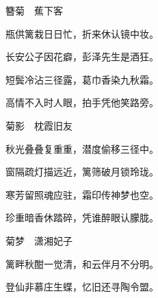 \begin{poem}
    \begin{pl}

        簪菊　蕉下客
    \end{pl}
    \begin{pl}

        瓶供篱栽日日忙，折来休认镜中妆。
    \end{pl}
    \begin{pl}

        长安公子因花癖，彭泽先生是酒狂。
    \end{pl}
    \begin{pl}

        短鬓冷沾三径露，葛巾香染九秋霜。
    \end{pl}
    \begin{pl}

        高情不入时人眼，拍手凭他笑路旁。
    \end{pl}
    \emptypl

    \begin{pl}

        菊影　枕霞旧友
    \end{pl}
    \begin{pl}

        秋光叠叠复重重，潜度偷移三径中。
    \end{pl}
    \begin{pl}

        窗隔疏灯描远近，篱筛破月锁玲珑。
    \end{pl}
    \begin{pl}

        寒芳留照魂应驻，霜印传神梦也空。
    \end{pl}
    \begin{pl}

        珍重暗香休踏碎，凭谁醉眼认朦胧。
    \end{pl}
    \emptypl

    \begin{pl}

        菊梦　潇湘妃子
    \end{pl}
    \begin{pl}

        篱畔秋酣一觉清，和云伴月不分明。
    \end{pl}
    \begin{pl}

        登仙非慕庄生蝶，忆旧还寻陶令盟。
    \end{pl}
    \begin{pl}


\end{pl}
\end{poem}
